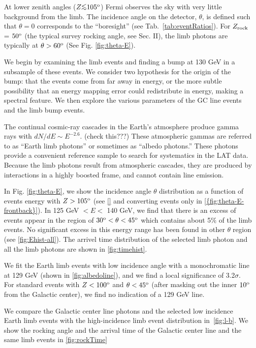 \documentclass[aps,twocolumn,prd,superscriptaddress,showpacs,nofootinbib,fixfloat]{revtex4}
\newcommand{\degree}{^{\rm o}}
\newcommand{\zrock}{$Z_{\rm rock}$}
\def\la{\vcenter{\hbox{$<$}\offinterlineskip\hbox{$\sim$}}}
\begin{document}
At lower zenith angles ($Z \la 105\degree$) Fermi observes
the sky with very little background from the limb.  The
incidence angle on the detector, $\theta$, is defined such
that $\theta=0$ corresponds to the ``boresight'' (see
Tab.~\ref{tab:eventRatios}).  For \zrock = $50\degree$ (the
typical survey rocking angle, see Sec. II), the limb photons
are typically at $\theta > 60\degree$ (See
Fig. \ref{fig:theta-E}).

We begin by examining the limb events and finding a bump at 130 GeV in a
subsample of these events.  We consider two hypothesis for the origin of the
bump: that the events come from far away in energy, or the more subtle
possibility that an energy mapping error could redistribute in energy, making
a spectral feature.  We then explore the various parameters of the GC line
events and the limb bump events. 

The continual cosmic-ray cascades in the Earth's atmosphere produce gamma rays
with $dN/dE \sim E^{-2.6}$.  (check this???)  These atmospheric gammas are
referred to as ``Earth limb photons'' or sometimes as ``albedo photons.''
These photons provide a convenient reference sample to search for systematics
in the LAT data.  Because the limb photons result from atmospheric cascades,
they are produced by interactions in a highly boosted frame, and cannot
contain line emission. 


In Fig. \ref{fig:theta-E}, we show the incidence angle
$\theta$ distribution as a function of events energy with $Z
> 105\degree$ (see \ref{}  and  converting events only in \ref{{fig:theta-E-frontback}}). In 125 GeV $< E <$ 140 GeV, we find that
there is an excess of events appear in the region of
$30\degree < \theta < 45\degree$ which contains about 5\% of
the limb events. No significant excess in this energy range
has been found in other $\theta$ region (see
\ref{fig:Ehist-all}). The arrivel time distribution of the
selected limb photon and all the limb photons are shown in
\ref{fig:timehist}.

We fit the Earth limb events with low
incidence angle with a monochromatic line at 129 GeV (shown
in \ref{fig:albedoline}), and we find a local significance
of 3.2$\sigma$. For standard events with $Z<100\degree$ and
$\theta<45\degree$ (after masking out the inner $10\degree$
from the Galactic center), we find no indication of a 129
GeV line.

We compare the Galactic center line photons and the selected
low incidence Earth limb events with the high-incidence limb
event distribution in~\ref{fig:l-b}. We show the rocking
angle and the arrival time of the Galactic center line and
the same limb events in \ref{fig:rockTime}
\end{document}
